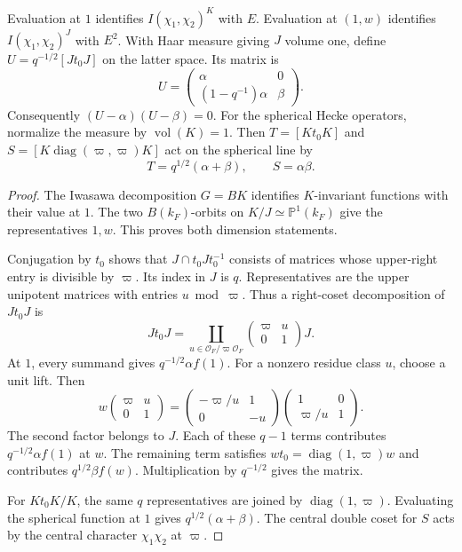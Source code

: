 \begin{proposition}
\label{v4-arith:w5-e:local:invariant-hecke}
Evaluation at $1$ identifies $I(\chi_1,\chi_2)^K$ with $E$.
Evaluation at $(1,w)$ identifies $I(\chi_1,\chi_2)^J$ with $E^2$.
With Haar measure giving $J$ volume one, define
$U=q^{-1/2}[Jt_0J]$ on the latter space. Its matrix is
\[
 U=\begin{pmatrix}
 \alpha&0\\ (1-q^{-1})\alpha&\beta
 \end{pmatrix}.
\]
Consequently $(U-\alpha)(U-\beta)=0$.
For the spherical Hecke operators, normalize the measure by
$\operatorname{vol}(K)=1$. Then
$T=[Kt_0K]$ and $S=[K\operatorname{diag}(\varpi,\varpi)K]$
act on the spherical line by
\[
 T=q^{1/2}(\alpha+\beta),\qquad S=\alpha\beta.
\]
\end{proposition}

\begin{proof}
The Iwasawa decomposition $G=BK$ identifies $K$-invariant functions
with their value at $1$. The two $B(k_F)$-orbits on
$K/J\simeq\mathbb P^1(k_F)$ give the representatives $1,w$.
This proves both dimension statements.

Conjugation by $t_0$ shows that $J\cap t_0Jt_0^{-1}$ consists of
matrices whose upper-right entry is divisible by $\varpi$.
Its index in $J$ is $q$. Representatives are the upper unipotent
matrices with entries $u\bmod\varpi$. Thus
a right-coset decomposition of $Jt_0J$ is
\[
 Jt_0J=\coprod_{u\in\mathcal O_F/\varpi\mathcal O_F}
 \begin{pmatrix}\varpi&u\\0&1\end{pmatrix}J.
\]
At $1$, every summand gives $q^{-1/2}\alpha f(1)$.
For a nonzero residue class $u$, choose a unit lift. Then
\[
 w\begin{pmatrix}\varpi&u\\0&1\end{pmatrix}
 =\begin{pmatrix}-\varpi/u&1\\0&-u\end{pmatrix}
  \begin{pmatrix}1&0\\\varpi/u&1\end{pmatrix}.
\]
The second factor belongs to $J$. Each of these $q-1$ terms contributes
$q^{-1/2}\alpha f(1)$ at $w$. The remaining term satisfies
$wt_0=\operatorname{diag}(1,\varpi)w$ and contributes
$q^{1/2}\beta f(w)$. Multiplication by $q^{-1/2}$ gives the matrix.

For $Kt_0K/K$, the same $q$ representatives are joined by
$\operatorname{diag}(1,\varpi)$. Evaluating the spherical function at
$1$ gives $q^{1/2}(\alpha+\beta)$. The central double coset for $S$
acts by the central character $\chi_1\chi_2$ at $\varpi$.
\end{proof}

